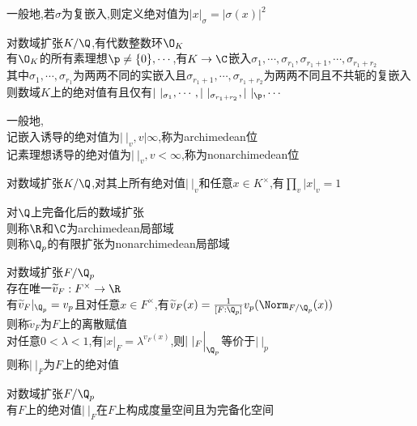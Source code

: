 \begin{zhu}
一般地,若$\sigma$为复嵌入,则定义绝对值为$|x|_{\sigma}=|\sigma(x)|^2$
\end{zhu}

\begin{dingli}
对数域扩张$K/\Q$,有代数整数环$\O_{K}$\\
有$\O_{K}$的所有素理想$\p\neq \{0\},\cdots$,有$K\to \C$嵌入$\sigma_1,\cdots,\sigma_{r_1},\sigma_{r_1+1},\cdots,\sigma_{r_1+r_2}$\\
其中$\sigma_1,\cdots,\sigma_{r_1}$为两两不同的实嵌入且$\sigma_{r_1+1},\cdots,\sigma_{r_1+r_2}$为两两不同且不共轭的复嵌入\\
则数域$K$上的绝对值有且仅有$|\ |_{\sigma_{1}},\cdots,|\ |_{\sigma_{r_1+r_2}},|\ |_{\p},\cdots$
\end{dingli}

\begin{zhu}
一般地,\\
记嵌入诱导的绝对值为$|\ |_{v},v|\infty$,称为archimedean位\\
记素理想诱导的绝对值为$|\ |_{v},v<\infty$,称为nonarchimedean位
\end{zhu}

\begin{dingli}
对数域扩张$K/\Q$,对其上所有绝对值$|\ |_{v}$和任意$x\in K^{\times}$,有$\prod\limits_{v}|x|_{v}=1$
\end{dingli}

\begin{dingyi}
对$\Q$上完备化后的数域扩张\\
则称$\R$和$\C$为archimedean局部域\\
则称$\Q_{p}$的有限扩张为nonarchimedean局部域
\end{dingyi}

\begin{dingyi}
对数域扩张$F/\Q_{p}$\\
存在唯一$\widetilde{v}_{F}:F^{\times}\to\R$\\
有$\widetilde{v}_{F}|_{\Q_{p}}=v_{p}$且对任意$x\in F^{\times}$,有$\widetilde{v}_{F}(x)=\frac{1}{[F:\Q_{p}]}v_{p}(\Norm_{F/\Q_{p}}(x))$\\
则称$\widetilde{v}_{F}$为$F$上的离散赋值\\
对任意$0<\lambda<1$,有$|x|_{F}=\lambda^{v_{F}(x)}$,则$|\ |_{F}\Big|_{\Q_{p}}$等价于$|\ |_{p}$\\
则称$|\ |_{F}$为$F$上的绝对值
\end{dingyi}

\begin{dingli}
对数域扩张$F/\Q_{p}$\\
有$F$上的绝对值$|\ |_{F}$在$F$上构成度量空间且为完备化空间
\end{dingli}

